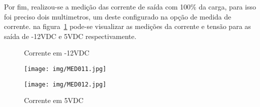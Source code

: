 \documentclass[
	article,			%
	11pt,				%
	oneside,			%
	a4paper,			%
	english,			%
	brazil,				%
	sumario=tradicional
	]{abntex2}
\begin{document}
Por fim, realizou-se a medição das corrente de saída com 100\% da carga, para isso foi preciso dois multimetros, um deste configurado na opção de medida de corrente. na figura~\ref{fig:FIG_MEDII} pode-se visualizar as medições da corrente e tensão para as saída de -12VDC e 5VDC respectivamente.
\begin{figure}[htb!]
   \centering
   \begin{minipage}{0.4\textwidth}
   		\centering
   		\caption{Corrente em -12VDC} \label{MED011}
   		\texttt{[image: img/MED011.jpg]}
   \end{minipage}
   \hspace{1.5cm}
   \begin{minipage}{0.4\textwidth}
   		\centering
   		\caption{Corrente em 5VDC} \label{MED012}
   		\texttt{[image: img/MED012.jpg]} 
   \end{minipage}
   \label{fig:FIG_MEDII}
\end{figure}
\end{document}
